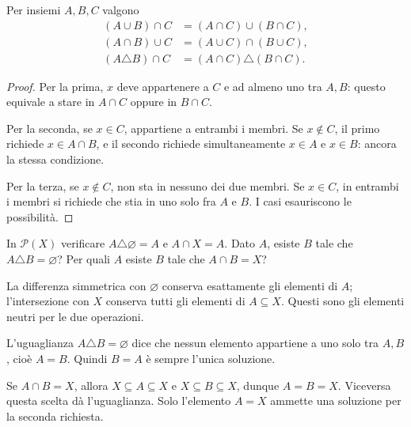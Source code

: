 \begin{proposizione}[Distributività]
Per insiemi $A,B,C$ valgono
\[
\begin{aligned}
(A\cup B)\cap C&=(A\cap C)\cup(B\cap C),\\
(A\cap B)\cup C&=(A\cup C)\cap(B\cup C),\\
(A\triangle B)\cap C&=(A\cap C)\triangle(B\cap C).
\end{aligned}
\]
\end{proposizione}
\begin{proof}
Per la prima, $x$ deve appartenere a $C$ e ad almeno uno tra $A,B$: questo equivale a stare in $A\cap C$ oppure in $B\cap C$.

Per la seconda, se $x\in C$, appartiene a entrambi i membri. Se $x\notin C$, il primo richiede $x\in A\cap B$, e il secondo richiede simultaneamente $x\in A$ e $x\in B$: ancora la stessa condizione.

Per la terza, se $x\notin C$, non sta in nessuno dei due membri. Se $x\in C$, in entrambi i membri si richiede che stia in uno solo fra $A$ e $B$. I casi esauriscono le possibilità.
\end{proof}

\begin{esercizio}
In $\mathcal P(X)$ verificare $A\triangle\varnothing=A$ e $A\cap X=A$. Dato $A$, esiste $B$ tale che $A\triangle B=\varnothing$? Per quali $A$ esiste $B$ tale che $A\cap B=X$?
\end{esercizio}
\begin{svolgimento}
La differenza simmetrica con $\varnothing$ conserva esattamente gli elementi di $A$; l'intersezione con $X$ conserva tutti gli elementi di $A\subseteq X$. Questi sono gli elementi neutri per le due operazioni.

L'uguaglianza $A\triangle B=\varnothing$ dice che nessun elemento appartiene a uno solo tra $A,B$, cioè $A=B$. Quindi $B=A$ è sempre l'unica soluzione.

Se $A\cap B=X$, allora $X\subseteq A\subseteq X$ e $X\subseteq B\subseteq X$, dunque $A=B=X$. Viceversa questa scelta dà l'uguaglianza. Solo l'elemento $A=X$ ammette una soluzione per la seconda richiesta.
\end{svolgimento}

